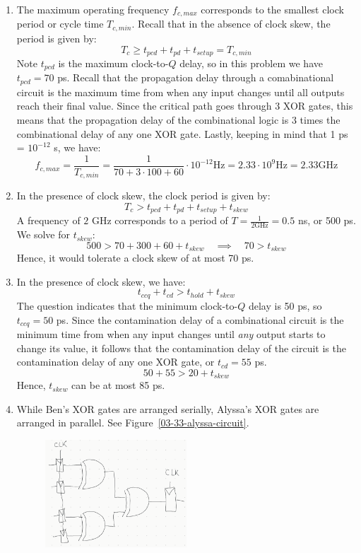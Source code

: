 \documentclass[12pt]{article}
\newenvironment{sol}[1][Solution]{\begin{trivlist}
		\item[\hskip \labelsep {\bfseries #1:}]}{\end{trivlist}}
\begin{document}
\begin{sol}
	\begin{enumerate}[label=(\alph*)]
		\item The maximum operating frequency $f_{c, max}$ corresponds to the smallest
		clock period or cycle time $T_{c, min}$. Recall that in the absence of
		clock skew, the period is given by:
		\[
		T_c\geq t_{pcd}+t_{pd}+t_{setup}=T_{c, min}
		\]
		Note $t_{pcd}$ is the maximum clock-to-$Q$ delay, so in this problem
		we have $t_{pcd}=70$ ps. Recall that the propagation delay through
		a comabinational circuit is the maximum time from when any input changes until
		all outputs reach their final value. Since the critical path goes through 3 XOR gates,
		this means that the propagation delay of the combinational logic is 3
		times the combinational delay of any one XOR gate. Lastly, keeping in mind
		that 1 ps = $10^{-12}$ s, we have:
		\[
		f_{c, max}=\frac{1}{T_{c, min}}=\frac{1}{70+3\cdot 100+60}\cdot 10^{-12} \text{Hz}
		=2.33\cdot 10^{9}\text{Hz}=2.33 \text{GHz}
		\]
		\item In the presence of clock skew, the clock period is given by:
		\[
		T_c > t_{pcd}+t_{pd}+t_{setup}+t_{skew}
		\]
		A frequency of $2$ GHz corresponds to a period of $T=\frac{1}{2\text{GHz}}=0.5$ ns,
		or 500 ps. We solve for $t_{skew}$:
		\[
		500> 70+300+60+t_{skew}\quad\implies\quad 70> t_{skew}
		\]
		Hence, it would tolerate a clock skew of at most 70 ps.
		\item In the presence of clock skew, we have:
		\[
		t_{ccq}+t_{cd}> t_{hold}+t_{skew}
		\]
		The question indicates that the minimum clock-to-$Q$ delay is 50 ps, so
		$t_{ccq}=50$ ps. Since the contamination delay of a combinational circuit is
		the minimum time from when any input changes until \emph{any} output
		starts to change its value, it follows that the contamination delay
		of the circuit is the contamination delay of any one XOR gate, or $t_{cd}=55$ ps.
		\[
		50+ 55> 20+t_{skew}
		\]
		Hence, $t_{skew}$ can be at most 85 ps.
		\item While Ben's XOR gates are arranged serially, Alyssa's XOR gates
		are arranged in parallel. See Figure~\ref{03-33-alyssa-circuit}.
		\begin{figure}
			\centering
			\includegraphics[width=0.5\textwidth]{03-33-alyssa-circuit}

\end{figure}
\end{enumerate}
\end{sol}
\end{document}
